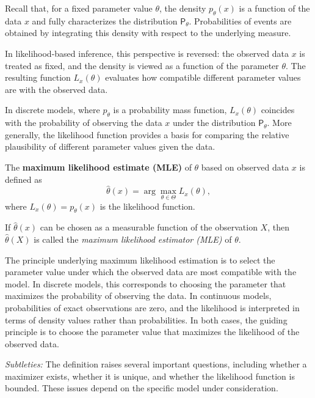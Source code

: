 Recall that, for a fixed parameter value \(\theta\), the density
\(p_\theta(x)\) is a function of the data \(x\) and fully characterizes
the distribution \(\mathsf{P}_\theta\). Probabilities of events are
obtained by integrating this density with respect to the underlying
measure.

In likelihood-based inference, this perspective is reversed: the
observed data \(x\) is treated as fixed, and the density is viewed as a
function of the parameter \(\theta\). The resulting function
\(L_x(\theta)\) evaluates how compatible different parameter values are
with the observed data.

In discrete models, where \(p_\theta\) is a probability mass function,
\(L_x(\theta)\) coincides with the probability of observing the data
\(x\) under the distribution \(\mathsf{P}_\theta\). More generally, the
likelihood function provides a basis for comparing the relative
plausibility of different parameter values given the data.

\begin{definition}
The \textbf{maximum likelihood estimate (MLE)} of \(\theta\) based on observed
data \(x\) is defined as
\[
    \hat{\theta}(x)
    = \arg\max_{\theta \in \Theta} L_x(\theta),
\]
where \(L_x(\theta) = p_\theta(x)\) is the likelihood function.

If \(\hat{\theta}(x)\) can be chosen as a measurable function of the
observation \(X\), then \(\hat{\theta}(X)\) is called the
\emph{maximum likelihood estimator (MLE)} of \(\theta\).
\end{definition}

The principle underlying maximum likelihood estimation is to select the
parameter value under which the observed data are most compatible with
the model. 
In discrete models, this corresponds to choosing the parameter that maximizes the probability of observing the data. In continuous models, probabilities of exact observations are zero, and the likelihood is interpreted in terms of density values rather than probabilities. In both cases, the guiding principle is to choose the parameter value that maximizes the likelihood of the observed data.


\medskip

\noindent\textit{Subtleties:}
The definition raises several important questions, including whether a
maximizer exists, whether it is unique, and whether the likelihood
function is bounded. These issues depend on the specific model under
consideration.

